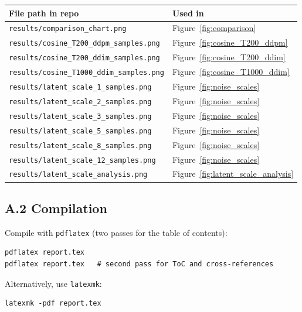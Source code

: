 \documentclass[11pt,a4paper]{article}
\begin{document}
\begin{center}
\begin{tabular}{ll}
\toprule
\textbf{File path in repo} & \textbf{Used in}\\
\midrule
\texttt{results/comparison\_chart.png}         & Figure~\ref{fig:comparison}\\
\texttt{results/cosine\_T200\_ddpm\_samples.png}  & Figure~\ref{fig:cosine_T200_ddpm}\\
\texttt{results/cosine\_T200\_ddim\_samples.png}  & Figure~\ref{fig:cosine_T200_ddim}\\
\texttt{results/cosine\_T1000\_ddim\_samples.png} & Figure~\ref{fig:cosine_T1000_ddim}\\
\texttt{results/latent\_scale\_1\_samples.png}   & Figure~\ref{fig:noise_scales}\\
\texttt{results/latent\_scale\_2\_samples.png}   & Figure~\ref{fig:noise_scales}\\
\texttt{results/latent\_scale\_3\_samples.png}   & Figure~\ref{fig:noise_scales}\\
\texttt{results/latent\_scale\_5\_samples.png}   & Figure~\ref{fig:noise_scales}\\
\texttt{results/latent\_scale\_8\_samples.png}   & Figure~\ref{fig:noise_scales}\\
\texttt{results/latent\_scale\_12\_samples.png}  & Figure~\ref{fig:noise_scales}\\
\texttt{results/latent\_scale\_analysis.png}     & Figure~\ref{fig:latent_scale_analysis}\\
\bottomrule
\end{tabular}
\end{center}

\subsection*{A.2 Compilation}

Compile with \texttt{pdflatex} (two passes for the table of contents):

\begin{verbatim}
pdflatex report.tex
pdflatex report.tex   # second pass for ToC and cross-references
\end{verbatim}

Alternatively, use \texttt{latexmk}:

\begin{verbatim}
latexmk -pdf report.tex
\end{verbatim}
\end{document}
